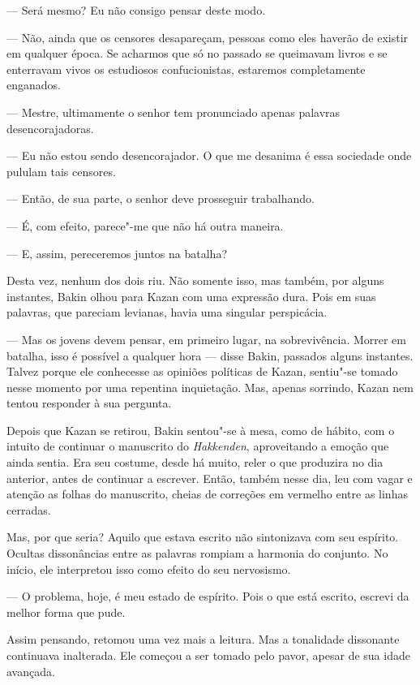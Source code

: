 --- Será mesmo? Eu não consigo pensar deste modo.

--- Não, ainda que os censores desapareçam, pessoas como eles haverão de
existir em qualquer época. Se acharmos que só no passado se queimavam
livros e se enterravam vivos os estudiosos confucionistas, estaremos
completamente enganados.

--- Mestre, ultimamente o senhor tem pronunciado apenas palavras
desencorajadoras.

--- Eu não estou sendo desencorajador. O que me desanima é essa sociedade
onde pululam tais censores.

--- Então, de sua parte, o senhor deve prosseguir trabalhando.

--- É, com efeito, parece"-me que não há outra maneira.

--- E, assim, pereceremos juntos na batalha?

Desta vez, nenhum dos dois riu. Não somente isso, mas também, por alguns
instantes, Bakin olhou para Kazan com uma expressão dura. Pois em suas
palavras, que pareciam levianas, havia uma singular perspicácia.

--- Mas os jovens devem pensar, em primeiro lugar, na sobrevivência.
Morrer em batalha, isso é possível a qualquer hora --- disse Bakin,
passados alguns instantes. Talvez porque ele conhecesse as opiniões
políticas de Kazan, sentiu"-se tomado nesse momento por uma repentina
inquietação. Mas, apenas sorrindo, Kazan nem tentou responder à sua
pergunta.

\sectionitem
Depois que Kazan se retirou, Bakin sentou"-se à mesa, como de hábito, com
o intuito de continuar o manuscrito do \textit{Hakkenden}, aproveitando
a emoção que ainda sentia. Era seu costume, desde há muito, reler o que
produzira no dia anterior, antes de continuar a escrever. Então, também
nesse dia, leu com vagar e atenção as folhas do manuscrito, cheias de
correções em vermelho entre as linhas cerradas.

Mas, por que seria? Aquilo que estava escrito não sintonizava com seu
espírito. Ocultas dissonâncias entre as palavras rompiam a harmonia do
conjunto. No início, ele interpretou isso como efeito do seu
nervosismo.

--- O problema, hoje, é meu estado de espírito. Pois o que está escrito,
escrevi da melhor forma que pude.

Assim pensando, retomou uma vez mais a leitura. Mas a tonalidade
dissonante continuava inalterada. Ele começou a ser tomado pelo pavor,
apesar de sua idade avançada.

